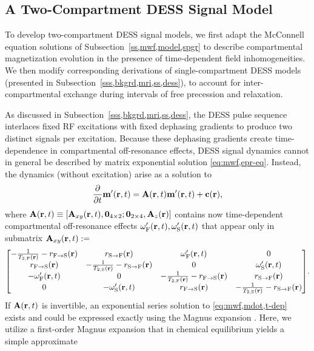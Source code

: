\subsection{A Two-Compartment DESS Signal Model}
\label{ss,mwf,model,dess}

To develop two-compartment DESS signal models,
we first adapt the McConnell equation solutions
of Subsection~\ref{ss,mwf,model,spgr}
to describe compartmental magnetization evolution
in the presence of time-dependent field inhomogeneities.
We then modify corresponding derivations
of single-compartment DESS models
(presented in Subsection~\ref{sss,bkgrd,mri,ss,dess}),
to account for inter-compartmental exchange 
during intervals of free precession and relaxation.

As discussed
in Subsection~\ref{sss,bkgrd,mri,ss,dess},
the DESS pulse sequence interlaces fixed RF excitations
with fixed dephasing gradients
to produce two distinct signals
per excitation.
Because these dephasing gradients
create time-dependence
in compartmental off-resonance effects,
DESS signal dynamics
cannot in general be described
by matrix exponential solution \eqref{eq:mwf,epr-eq}.
Instead, 
the dynamics (without excitation) arise as a solution to
\begin{align}
	\dela{t} \bmmp\prt = \bmA\prt \bmmp\prt + \bmc\pr,
	\label{eq:mwf,mdot,t-dep}
\end{align}
where
$\bmA\prt \equiv \brac{\bmAxy\prt, \zeros{4 \times 2};
\zeros{2 \times 4}, \bmAz\pr}$
contains now time-dependent compartmental off-resonance effects
$\ompf\prt, \omps\prt$
that appear only in submatrix
$\bmAxy\prt :=$
\begin{align}
	\begin{bmatrix}
		-\frac{1}{\tf{2}\pr}-\rfs\pr & \rsf\pr & \ompf\prt & 0 \\
		\rfs\pr & -\frac{1}{\ts{2}\pr}-\rsf\pr & 0 & \omps\prt \\
		-\ompf\prt & 0 & -\frac{1}{\tf{2}\pr}-\rfs\pr & \rsf\pr \\
		0 & -\omps\prt & \rfs\pr & -\frac{1}{\ts{2}\pr}-\rsf\pr
	\end{bmatrix}.
	\label{eq:mwf,Axy-t-dep}
\end{align}
If $\bmA\prt$ is invertible,
an exponential series solution
to \eqref{eq:mwf,mdot,t-dep} exists
and could be expressed exactly
using the Magnus expansion \cite{magnus:54:ote}. 
Here, 
we utilize a first-order Magnus expansion 
that in chemical equilibrium yields
a simple approximate 
